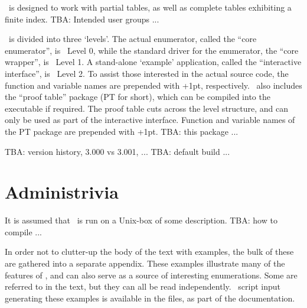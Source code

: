 


\ace\ is designed to work with partial tables, as well as complete tables
  exhibiting a finite index.
TBA:
Intended user groups ...

\ace\ is divided into three `levels'\kern-1.5pt.
The actual enumerator, called the ``core enumerator''\kern-2pt, is \ace\ 
  Level 0, while the standard driver for the enumerator, the ``core 
  wrapper''\kern-2pt, is \ace\ Level 1.
A stand-alone `example' application, called the ``interactive 
  interface''\kern-2pt, is \ace\ Level 2.
To assist those interested in the actual source code, the function and 
  variable names are prepended with \ttt{AL0\_}\kern+1pt, \ttt{AL1\_} \amp
  \ttt{AL2\_} respectively.
%
\ace\ also includes the ``proof table'' package (PT for short), which can
  be compiled into the executable if required.
The proof table cuts across the level structure, and can only be used as
  part of the interactive interface.
Function and variable names of the PT package are prepended with 
  \ttt{PT\_}\kern+1pt.
TBA: this package ...

TBA: version history, 3.000 vs 3.001, ...
TBA: default build ...

\section{Administrivia}

It is assumed that \ace\ is run on a Unix-box of some description.
TBA: how to compile ...

In order not to clutter-up the body of the text with examples, the bulk of
  these are gathered into a separate appendix.
These examples illustrate many of the features of \ace, and can also serve
  as a source of interesting enumerations.
Some are referred to in the text, but they can all be read independently.
\ace\ script input generating these examples is available in the 
  \ttt{ex***.in} files, as part of the documentation.

